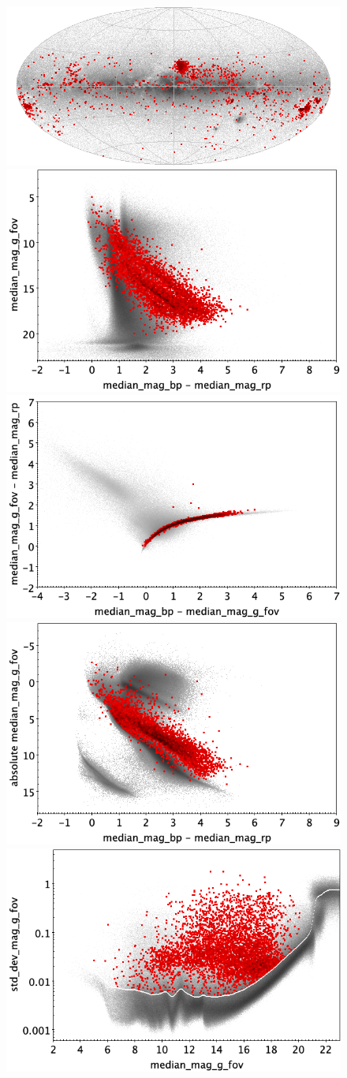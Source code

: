 \documentclass[longauth]{aa}
\begin{document}
\begin{appendix}
\begin{figure}
\centering
{} \includegraphics[width=0.6\hsize]{figures/appendix/YSO_trn_sky.png} \\ %
\vspace{4mm}
 \includegraphics[width=0.45\hsize]{figures/appendix/YSO_trn_cm.png}  %
\hspace{2mm}
 \includegraphics[width=0.45\hsize]{figures/appendix/YSO_trn_cc.png} \\ %
\vspace{4mm}
 \includegraphics[width=0.45\hsize]{figures/appendix/YSO_trn_cam.png}  %
\hspace{2mm}
 \includegraphics[width=0.45\hsize]{figures/appendix/YSO_trn_msd.png} \\ %

\end{figure}
\end{appendix}
\end{document}
